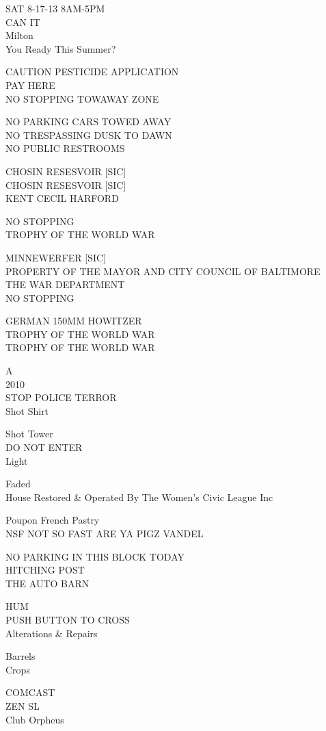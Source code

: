 \documentclass[10pt,letterpaper]{article}
\begin{document}
SAT 8{-}17{-}13 8AM{-}5PM\\
CAN IT\\
Milton\\
You Ready This Summer?

CAUTION PESTICIDE APPLICATION\\
PAY HERE\\
NO STOPPING TOWAWAY ZONE

NO PARKING CARS TOWED AWAY\\
NO TRESPASSING DUSK TO DAWN\\
NO PUBLIC RESTROOMS

CHOSIN RESESVOIR {[}SIC{]}\\
CHOSIN RESESVOIR {[}SIC{]}\\
KENT CECIL HARFORD

NO STOPPING\\
TROPHY OF THE WORLD WAR

MINNEWERFER {[}SIC{]}\\
PROPERTY OF THE MAYOR AND CITY COUNCIL OF BALTIMORE\\
THE WAR DEPARTMENT\\
NO STOPPING

GERMAN 150MM HOWITZER\\
TROPHY OF THE WORLD WAR\\
TROPHY OF THE WORLD WAR

A\\
2010\\
STOP POLICE TERROR\\
Shot Shirt

Shot Tower\\
DO NOT ENTER\\
Light

Faded\\
House Restored \& Operated By The Women's Civic League Inc

Poupon French Pastry\\
NSF NOT SO FAST ARE YA PIGZ VANDEL

NO PARKING IN THIS BLOCK TODAY\\
HITCHING POST\\
THE AUTO BARN

HUM\\
PUSH BUTTON TO CROSS\\
Alterations \& Repairs

Barrels\\
Crops

COMCAST\\
ZEN SL\\
Club Orpheus
\end{document}
